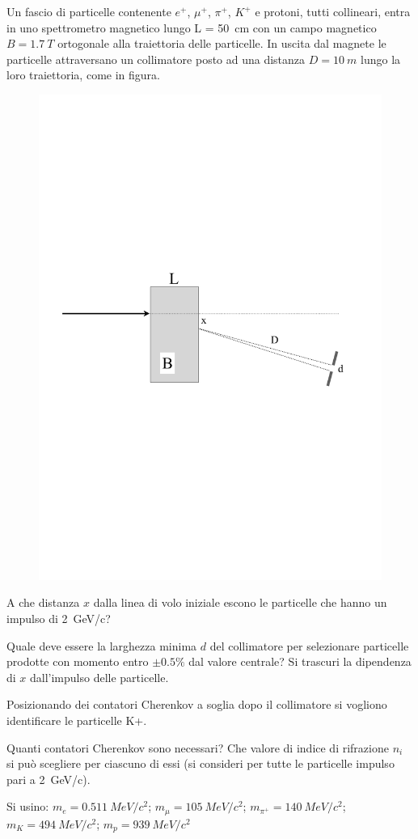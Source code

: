 \begin{Exercise}[title={Spettrometro, Cherenkov a soglia}]
  Un fascio di particelle contenente $e^+$, $\mu^+$, $\pi^+$, $K^+$ e protoni, tutti collineari, entra in uno spettrometro magnetico lungo L = \SI{50}{cm} con un campo magnetico $B = \SI{1.7}{T}$ ortogonale alla traiettoria delle particelle. In uscita dal magnete le particelle attraversano un collimatore posto ad una distanza $D = \SI{10}{m}$ lungo la loro traiettoria, come in figura.
  \begin{figure}[ht]
  \begin{center}
    \includegraphics[width=0.49\linewidth]{fig-2021-04-07-fig1}
  \end{center}
  \end{figure}

  \Question A che distanza $x$ dalla linea di volo iniziale escono le particelle che hanno un impulso di \SI{2}{GeV/c}?   

  \Question Quale deve essere la larghezza minima $d$ del collimatore per selezionare particelle prodotte con momento entro $\pm 0.5\%$ dal valore centrale? Si trascuri la dipendenza di $x$ dall’impulso delle particelle.

  Posizionando dei contatori Cherenkov a soglia dopo il collimatore si vogliono identificare le particelle K+.

  \Question Quanti contatori Cherenkov sono necessari? Che valore di indice di rifrazione $n_i$ si pu\`o scegliere per ciascuno di essi (si consideri per tutte le particelle impulso pari a \SI{2}{GeV/c}).

  Si usino: $m_e = \SI{0.511}{MeV/c^2}$; $m_\mu = \SI{105}{MeV/c^2}$; $m_{\pi^+} = \SI{140}{MeV/c^2}$; $m_K = \SI{494}{MeV/c^2}$; $m_p = \SI{939}{MeV/c^2}$
\end{Exercise}
